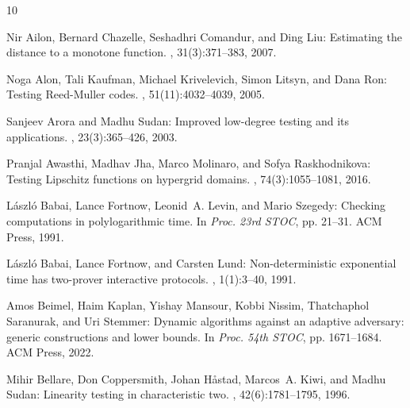 \documentclass[11pt]{article}
\numberwithin{equation}{section}
\theoremstyle{definition}
\theoremstyle{plain}
\begin{document}
\tocrefpdfbookmark
\begin{thebibliography}{10}

{\sc Nir Ailon, Bernard Chazelle, Seshadhri Comandur, and Ding Liu}: Estimating
  the distance to a monotone function.
, 31(3):371--383, 2007.

{\sc Noga Alon, Tali Kaufman, Michael Krivelevich, Simon Litsyn, and Dana Ron}:
  Testing {Reed-Muller} codes.
, 51(11):4032--4039, 2005.

{\sc Sanjeev Arora and Madhu Sudan}: Improved low-degree testing and its
  applications.
, 23(3):365--426, 2003.
\newblock [\epfmtdoi{10.1007/s00493-003-0025-0}]

{\sc Pranjal Awasthi, Madhav Jha, Marco Molinaro, and Sofya Raskhodnikova}:
  Testing {Lipschitz} functions on hypergrid domains.
, 74(3):1055--1081, 2016.
\newblock [\epfmtdoi{10.1007/s00453-015-9984-y}]

{\sc L{\'{a}}szl{\'{o}} Babai, Lance Fortnow, Leonid~A. Levin, and Mario
  Szegedy}: Checking computations in polylogarithmic time.
\newblock In {\em Proc. 23rd STOC}, pp. 21--31. ACM Press, 1991.
\newblock [\epfmtdoi{10.1145/103418.103428}]

{\sc L{\'{a}}szl{\'{o}} Babai, Lance Fortnow, and Carsten Lund}:
  Non-deterministic exponential time has two-prover interactive protocols.
, 1(1):3--40, 1991.
\newblock [\epfmtdoi{10.1007/BF01200056}]

{\sc Amos Beimel, Haim Kaplan, Yishay Mansour, Kobbi Nissim, Thatchaphol
  Saranurak, and Uri Stemmer}: Dynamic algorithms against an adaptive
  adversary: generic constructions and lower bounds.
\newblock In {\em Proc. 54th STOC}, pp. 1671--1684. ACM Press, 2022.
\newblock [\epfmtdoi{10.1145/3519935.3520064}]

{\sc Mihir Bellare, Don Coppersmith, Johan H{\aa}stad, Marcos~A. Kiwi, and
  Madhu Sudan}: Linearity testing in characteristic two.
, 42(6):1781--1795, 1996.
\newblock [\epfmtdoi{10.1109/18.556674}]


\end{thebibliography}
\end{document}
